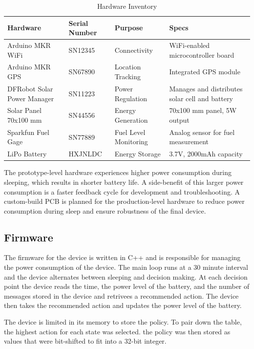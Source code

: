 \documentclass[10pt]{cai}
\begin{document}
\begin{table}[h!]
  \centering
  \caption{Hardware Inventory}
  \begin{tabular}{|l|l|l|l|}
  \hline
  \textbf{Hardware} & \textbf{Serial Number} & \textbf{Purpose} & \textbf{Specs} \\ \hline
  Arduino MKR WiFi & SN12345 & Connectivity & WiFi-enabled microcontroller board \\ \hline
  Arduino MKR GPS  & SN67890 & Location Tracking & Integrated GPS module \\ \hline
  DFRobot Solar Power Manager & SN11223 & Power Regulation & Manages and distributes solar cell and battery \\ \hline
  Solar Panel 70x100 mm & SN44556 & Energy Generation & 70x100 mm panel, 5W output \\ \hline
  Sparkfun Fuel Gage & SN77889 & Fuel Level Monitoring & Analog sensor for fuel measurement \\ \hline
  LiPo Battery & HXJNLDC & Energy Storage & 3.7V, 2000mAh capacity \\ \hline
  \end{tabular}
  \label{tab:hardware_inventory}
  \end{table}

The prototype-level hardware experiences higher power consumption during sleeping, which results in shorter battery life. 
A side-benefit of this larger power consumption is a faster feedback cycle for development and troubleshooting. 
A custom-build PCB is planned for the production-level hardware to reduce power consumption during sleep and ensure robustness of the final device.

\subsection{Firmware}
The firmware for the device is written in C++ and is responsible for managing the power consumption of the device.
The main loop runs at a 30 minute interval and the device alternates between sleeping and decision making.
At each decision point the device reads the time, the power level of the battery, and the number of messages stored in the device and retrivees a recommended action.
The device then takes the recommended action and updates the power level of the battery.

The device is limited in its memory to store the policy.
To pair down the table, the highest action for each state was selected.
the policy was then stored as values that were bit-shifted to fit into a 32-bit integer.
\end{document}
